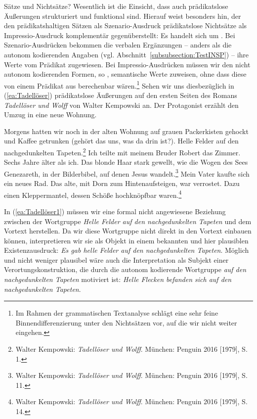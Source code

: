 \begin{Exkurs}{Sätze und Nichtsätze?}
Wesentlich ist die Einsicht, dass auch prädikatslose Äußerungen strukturiert und funktional sind. Hierauf weist besonders \citet[170]{Agel2017} hin, der den prädikatshaltigen Sätzen als Szenario-Ausdruck prädikatslose Nichtsätze als Impressio-Ausdruck komplementär gegenüberstellt: Es handelt sich um . Bei Szenario-Ausdrücken bekommen die verbalen Ergänzungen -- anders als die autonom kodierenden Angaben (vgl. Abschnitt~\ref{subsubsection:TestINSP}) -- ihre Werte vom Prädikat zugewiesen. Bei Impressio-Ausdrücken müssen wir den nicht autonom kodierenden Formen, so \citet[170]{Agel2017},  semantische Werte zuweisen, ohne dass diese von einem Prädikat aus berechenbar wären.\footnote{Im Rahmen der grammatischen Textanalyse schlägt \citet[175--191]{Agel2017} eine sehr feine Binnendifferenzierung unter den Nichtsätzen vor, auf die wir nicht weiter eingehen.} Sehen wir uns diesbezüglich in (\ref{ea:Tadellöser}) prädikatslose Äußerungen auf den ersten Seiten des Romans \textit{Tadellöser und Wolff} von Walter Kempowski an. Der Protagonist erzählt den Umzug in eine neue Wohnung.

\ea \label{ea:Tadellöser}
\ea \label{ea:Tadellöser1} Morgens hatten wir noch in der alten Wohnung auf grauen Packerkisten gehockt und Kaffee getrunken (gehört das uns, was da drin ist?). Helle Felder auf den nachgedunkelten Tapeten.\footnote{Walter Kempowski: \textit{Tadellöser und Wolff}. München: Penguin 2016 [1979], S. 1.}
\ex \label{ex:Tadellöser2} Ich teilte mit meinem Bruder Robert das Zimmer. Sechs
Jahre älter als ich. Das blonde Haar stark gewellt, wie die Wogen des Sees Genezareth, in der Bilderbibel, auf denen Jesus wandelt.\footnote{Walter Kempowski: \textit{Tadellöser und Wolff}. München: Penguin 2016 [1979], S. 11.}
\ex \label{ex:Tadellöser3} Mein Vater kaufte sich ein neues Rad. Das alte, mit Dorn
zum Hintenaufsteigen, war verrostet. Dazu einen Kleppermantel, dessen Schöße hochknöpfbar waren.\footnote{Walter Kempowski: \textit{Tadellöser und Wolff}. München: Penguin 2016 [1979], S. 14.}
\z 
\z 

In (\ref{ea:Tadellöser1}) müssen wir eine formal nicht angewiesene Beziehung zwischen der Wortgruppe \textit{Helle Felder auf den nachgedunkelten Tapeten} und dem Vortext herstellen. Da wir diese Wortgruppe nicht direkt in den Vortext einbauen können, interpretieren wir sie als Objekt in einem bekannten und hier plausiblen Existenzausdruck: \textit{Es gab helle Felder auf den nachgedunkelten Tapeten}. Möglich und nicht weniger plausibel wäre auch die Interpretation als Subjekt einer Verortungskonstruktion, die durch die autonom kodierende Wortgruppe \textit{auf den nachgedunkelten Tapeten} motiviert ist: \textit{Helle Flecken befanden sich auf den nachgedunkelten Tapeten}.


\end{Exkurs}
